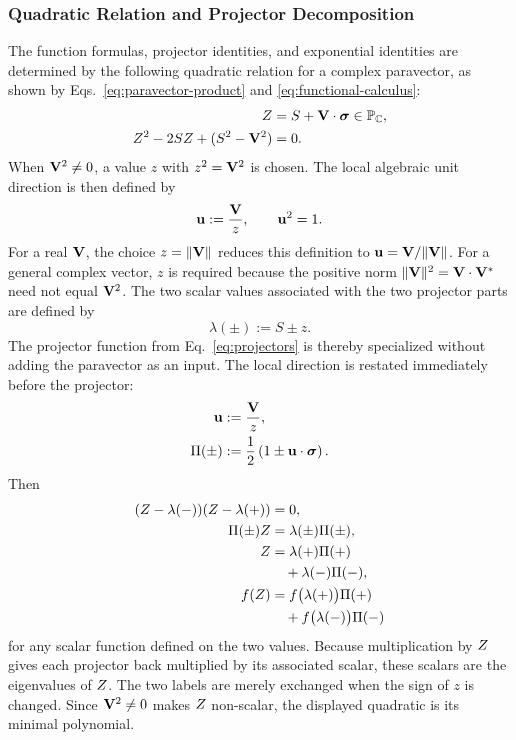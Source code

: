 \subsubsection{Quadratic Relation and Projector Decomposition}
The function formulas, projector identities, and exponential identities
are determined by the following quadratic relation for a complex
paravector, as shown by Eqs.\ \eqref{eq:paravector-product} and
\eqref{eq:functional-calculus}:
\begin{align*}
Z &= S + \mathbf{V} \cdot \mathbf{\bm{\sigma}} \in \mathbb{P}_{\mathbb{C}}, \\
Z^{2} - 2 S Z + ( S^{2} - \mathbf{V}^{2} ) &= 0.
\end{align*}
When \(\mathbf{V}^{2}\neq0\), a value \(z\) with \(z^2=\mathbf{V}^2\) is chosen.
The local algebraic unit direction is then defined by
\begin{equation}
\mathbf{u}:=\frac{\mathbf{V}}{z},
\qquad
\mathbf{u}^2=1.
\label{eq:complex-paravector-axis}
\end{equation}
For a real \(\mathbf{V}\), the choice
\(z=\|\mathbf{V}\|\) reduces this definition to
\(\mathbf{u}=\mathbf{V}/\|\mathbf{V}\|\). For a general complex vector, \(z\) is
required because the positive norm
\(\|\mathbf{V}\|^2=\mathbf{V}\cdot\mathbf{V}^*\) need not equal
\(\mathbf{V}^2\). The two
scalar values associated with the two projector parts are defined by
\begin{equation}
\lambda(\pm):=S\pm z.
\label{eq:complex-paravector-eigenvalues}
\end{equation}
The projector function from Eq.\ \eqref{eq:projectors} is thereby
specialized without adding the paravector as an input. The local direction
is restated immediately before the projector:
\begin{align}
\mathbf{u}&:=\frac{\mathbf{V}}{z},\notag\\
\Pi(\pm)&:=\frac12\left(1\pm\mathbf{u}\cdot\mathbf{\bm{\sigma}}\right).
\label{eq:complex-paravector-projectors}
\end{align}
Then
\begin{align*}
( Z - \lambda(-) )
( Z - \lambda(+) ) &= 0,\\
\Pi(\pm)Z
&=\lambda(\pm)\Pi(\pm),\\
Z&=\lambda(+)\Pi(+)\notag\\
&\quad+\lambda(-)\Pi(-),\\
f(Z)&=f\bigl(\lambda(+)\bigr)\Pi(+)
 \notag\\
&\quad+f\bigl(\lambda(-)\bigr)\Pi(-)
\end{align*}
for any scalar function defined on the two values. Because multiplication
by \(Z\) gives each projector back multiplied by its associated scalar,
these scalars are the eigenvalues of \(Z\). The two labels are
merely exchanged when the sign of \(z\) is changed.
Since \(\mathbf{V}^{2}\neq0\) makes \(Z\) non-scalar, the displayed
quadratic is its minimal polynomial.

